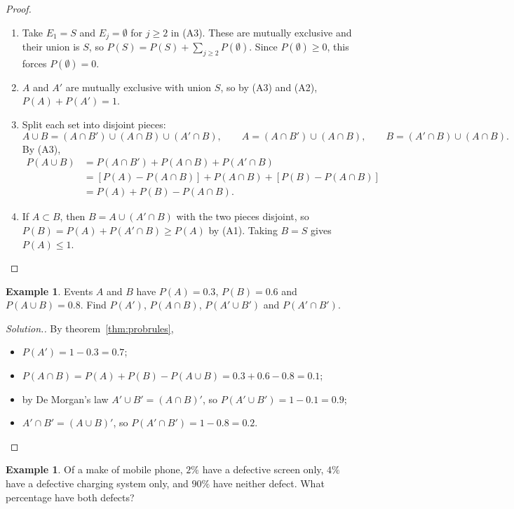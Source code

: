 \documentclass[12pt,a4paper]{report}
\theoremstyle{definition}
\newtheorem{example}[thm]{Example}
\theoremstyle{plain}
\theoremstyle{definition}
\newenvironment{solution}
  {\renewcommand{\qedsymbol}{}\begin{proof}[\textit{Solution}.]}
  {\end{proof}}
\begin{document}
\begin{proof}
\begin{enumerate}
\item[(i)] Take $E_1 = S$ and $E_j = \emptyset$ for $j\ge 2$ in (A3). These are mutually
exclusive and their union is $S$, so $P(S) = P(S) + \sum_{j\ge 2}P(\emptyset)$. Since
$P(\emptyset)\ge 0$, this forces $P(\emptyset) = 0$.
\item[(ii)] $A$ and $A'$ are mutually exclusive with union $S$, so by (A3) and (A2),
$P(A) + P(A') = 1$.
\item[(iii)] Split each set into disjoint pieces:
\[A\cup B = (A\cap B')\cup(A\cap B)\cup(A'\cap B),\qquad
A = (A\cap B')\cup(A\cap B),\qquad
B = (A'\cap B)\cup(A\cap B).\]
By (A3),
\begin{align*}
P(A\cup B) &= P(A\cap B') + P(A\cap B) + P(A'\cap B)\\
&= \left[P(A) - P(A\cap B)\right] + P(A\cap B) + \left[P(B) - P(A\cap B)\right]\\
&= P(A) + P(B) - P(A\cap B).
\end{align*}
\item[(iv)] If $A\subset B$, then $B = A\cup(A'\cap B)$ with the two pieces disjoint, so
$P(B) = P(A) + P(A'\cap B)\ge P(A)$ by (A1). Taking $B = S$ gives $P(A)\le 1$.
\end{enumerate}
\end{proof}

\begin{example}
\label{ex:rulesnumbers}
Events $A$ and $B$ have $P(A) = 0.3$, $P(B) = 0.6$ and $P(A\cup B) = 0.8$. Find
$P(A')$, $P(A\cap B)$, $P(A'\cup B')$ and $P(A'\cap B')$.
\end{example}

\begin{solution}
By theorem~\ref{thm:probrules},
\begin{itemize}
\item $P(A') = 1 - 0.3 = 0.7$;
\item $P(A\cap B) = P(A) + P(B) - P(A\cup B) = 0.3 + 0.6 - 0.8 = 0.1$;
\item by De Morgan's law $A'\cup B' = (A\cap B)'$, so $P(A'\cup B') = 1 - 0.1 = 0.9$;
\item $A'\cap B' = (A\cup B)'$, so $P(A'\cap B') = 1 - 0.8 = 0.2$.
\end{itemize}
\end{solution}

\begin{example}
\label{ex:phonedefects}
Of a make of mobile phone, $2\%$ have a defective screen only, $4\%$ have a
defective charging system only, and $90\%$ have neither defect. What percentage have
both defects?
\end{example}
\end{document}
